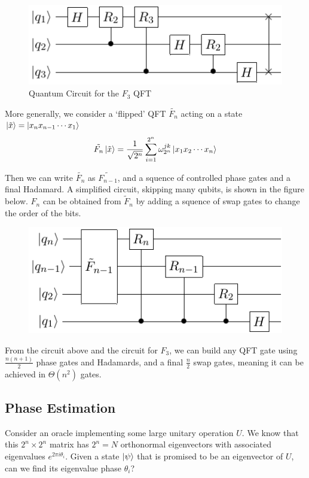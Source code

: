 \documentclass[11pt]{article}
\begin{document}
\begin{figure}[h]
    \centering
    \includegraphics[width=.5\textwidth]{Circuits/F3.pdf}
    \caption{Quantum Circuit for the $F_{3}$ QFT}
\end{figure}

More generally, we consider a `flipped' QFT $\tilde{F_{n}}$ acting on a state $\ket{\tilde{x}}=\ket{x_{n}x_{n-1}\cdots x_{1}}$
\begin{equation}
    \tilde{F_{n}}\ket{\tilde{x}} =
    \frac{1}{\sqrt{2^{n}}}\sum_{i=1}^{2^{n}}\omega_{2^{n}}^{jk}\ket{x_{1}x_{2}\cdots x_{n}}
\end{equation}

Then we can write $\tilde{F_{n}}$ as $\tilde{F_{n-1}}$, and a squence of controlled phase gates and a final Hadamard. A simplified circuit, skipping many qubits, is shown in the figure below. $F_{n}$ can be obtained from $\tilde{F}_{n}$ by adding a squence of swap gates to change the order of the bits.

\begin{figure}[h]
    \centering
    \includegraphics[width=.5\textwidth]{Circuits/Fm.pdf}
\end{figure}

From the circuit above and the circuit for $F_{3}$, we can build any QFT gate using $\frac{n(n+1)}{2}$ phase gates and Hadamards, and a final $\frac{n}{2}$ swap gates, meaning it can be achieved in $\Theta (n^{2})$ gates.

\subsection*{Phase Estimation}
Consider an oracle implementing some large unitary operation $U$. We know that this $2^{n}\times2^{n}$ matrix has $2^{n}=N$ orthonormal eigenvectors with associated eigenvalues $e^{2\pi i \theta_{i}}$. Given a state $\ket{\psi}$ that is promised to be an eigenvector of $U$, can we find its eigenvalue phase $\theta_{i}$?
\end{document}
